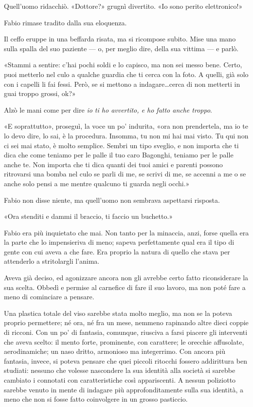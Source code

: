 Quell'uomo ridacchiò. «Dottore?» grugnì divertito. «Io sono perito elettronico!»

Fabio rimase tradito dalla sua eloquenza.

Il ceffo eruppe in una beffarda risata, ma si ricompose subito. Mise una mano sulla spalla del suo paziente --- o, per meglio dire, della sua vittima --- e parlò.

«Stammi a sentire: c'hai pochi soldi e lo capisco, ma non sei messo bene. Certo, puoi metterlo nel culo a qualche guardia che ti cerca con la foto. A quelli, già solo con i capelli li fai fessi. Però, se si mettono a indagare\ldots{}cerca di non metterti in guai troppo grossi, ok?»

Alzò le mani come per dire \emph{io ti ho avvertito, e ho fatto anche troppo}.

«E soprattutto», proseguì, la voce un po' indurita, «ora non prendertela, ma io te lo devo dire, lo sai, è la procedura. Insomma, tu non mi hai mai visto. Tu qui non ci sei mai stato, è molto semplice. Sembri un tipo sveglio, e non importa che ti dica che come teniamo per le palle il tuo caro Bagonghi, teniamo per le palle anche te. Non importa che ti dica quanti dei tuoi amici e parenti possono ritrovarsi una bomba nel culo se parli di me, se scrivi di me, se accenni a me o se anche solo pensi a me mentre qualcuno ti guarda negli occhi.»

Fabio non disse niente, ma quell'uomo non sembrava aspettarsi risposta.

«Ora stenditi e dammi il braccio, ti faccio un buchetto.»

Fabio era più inquietato che mai. Non tanto per la minaccia, anzi, forse quella era la parte che lo impensieriva di meno; sapeva perfettamente qual era il tipo di gente con cui aveva a che fare. Era proprio la natura di quello che stava per attenderlo a stritolargli l'anima.

Aveva già deciso, ed agonizzare ancora non gli avrebbe certo fatto riconsiderare la sua scelta. Obbedì e permise al carnefice di fare il suo lavoro, ma non poté fare a meno di cominciare a pensare.

Una plastica totale del viso sarebbe stata molto meglio, ma non se la poteva proprio permettere; né ora, né fra un mese, nemmeno rapinando altre dieci coppie di ricconi. Con un po' di fantasia, comunque, riusciva a farsi piacere gli interventi che aveva scelto: il mento forte, prominente, con carattere; le orecchie affusolate, aerodinamiche; un naso dritto, armonioso ma integerrimo. Con ancora più fantasia, invece, si poteva pensare che quei piccoli ritocchi fossero addirittura ben studiati: nessuno che volesse nascondere la sua identità alla società si sarebbe cambiato i connotati con caratteristiche così appariscenti. A nessun poliziotto sarebbe venuto in mente di indagare più approfonditamente sulla sua identità, a meno che non si fosse fatto coinvolgere in un grosso pasticcio.

